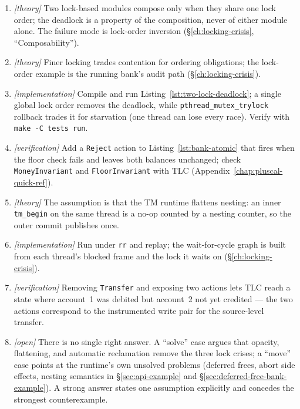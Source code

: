 \begin{enumerate}
    \item \emph{[theory]} Two lock-based modules compose only when they
          share one lock order; the deadlock is a property of the
          composition, never of either module alone.  The failure mode is
          lock-order inversion (\S\ref{ch:locking-crisis}, ``Composability'').
    \item \emph{[theory]} Finer locking trades contention for ordering
          obligations; the lock-order example is the running bank's audit
          path (\S\ref{ch:locking-crisis}).
    \item \emph{[implementation]} Compile and run
          Listing~\ref{lst:two-lock-deadlock}; a single global lock order
          removes the deadlock, while \texttt{pthread\_mutex\_trylock}
          rollback trades it for starvation (one thread can lose every
          race).  Verify with \texttt{make -C tests run}.
    \item \emph{[verification]} Add a \texttt{Reject} action to
          Listing~\ref{lst:bank-atomic} that fires when the floor check
          fails and leaves both balances unchanged; check
          \texttt{MoneyInvariant} and \texttt{FloorInvariant} with TLC
          (Appendix~\ref{chap:pluscal-quick-ref}).
    \item \emph{[theory]} The assumption is that the TM runtime flattens
          nesting: an inner \texttt{tm\_begin} on the same thread is a no-op
          counted by a nesting counter, so the outer commit publishes once.
    \item \emph{[implementation]} Run under \texttt{rr} and replay; the
          wait-for-cycle graph is built from each thread's blocked frame and
          the lock it waits on (\S\ref{ch:locking-crisis}).
    \item \emph{[verification]} Removing \texttt{Transfer} and exposing two
          actions lets TLC reach a state where account~1 was debited but
          account~2 not yet credited --- the two actions correspond to the
          instrumented write pair for the source-level transfer.
    \item \emph{[open]} There is no single right answer.  A ``solve'' case
          argues that opacity, flattening, and automatic reclamation remove
          the three lock crises; a ``move'' case points at the runtime's
          own unsolved problems (deferred frees, abort side effects,
          nesting semantics in \S\ref{sec:api-example} and
          \S\ref{sec:deferred-free-bank-example}).  A strong answer states
          one assumption explicitly and concedes the strongest
          counterexample.
\end{enumerate}

